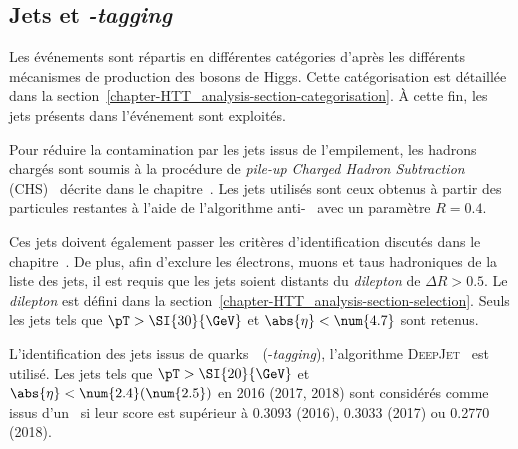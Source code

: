 \subsection{Jets et \emph{\quarkb-tagging}}\label{chapter-HTT_analysis-section-objects-jets}
Les événements sont répartis en différentes catégories d'après les différents mécanismes de production des bosons de Higgs.
Cette catégorisation est détaillée dans la section~\ref{chapter-HTT_analysis-section-categorisation}.
À cette fin, les jets présents dans l'événement sont exploités.
\par
Pour réduire la contamination par les jets issus de l'empilement, les hadrons chargés sont soumis à la procédure de \emph{pile-up Charged Hadron Subtraction} (CHS)~\cite{CMS-PAS-JME-14-001} décrite dans le chapitre~.
Les jets utilisés sont ceux obtenus à partir des particules restantes à l'aide de l'algorithme anti-\kT~\cite{Cacciari_antikT} avec un paramètre $R=\num{0.4}$.
\par
Ces jets doivent également passer les critères d'identification discutés dans le chapitre~.
De plus, afin d'exclure les électrons, muons et taus hadroniques de la liste des jets, il est requis que les jets soient distants du \emph{dilepton} de $\Delta R > \num{0.5}$.
Le \emph{dilepton} est défini dans la section~\ref{chapter-HTT_analysis-section-selection}.
Seuls les jets tels que $\pT > \SI{30}{\GeV}$ et $\abs{\eta}<\num{4.7}$ sont retenus.
\par
L'identification des jets issus de quarks~\quarkb\ (\quarkb-\emph{tagging}), l'algorithme \textsc{DeepJet}~\cite{DeepJet} est utilisé.
Les jets tels que $\pT > \SI{20}{\GeV}$ et $\abs{\eta}<\num{2.4} (\num{2.5})$ en 2016 (2017, 2018) sont considérés comme issus d'un \quarkb\ si leur score est supérieur à \num{0.3093} (2016), \num{0.3033} (2017) ou \num{0.2770} (2018).